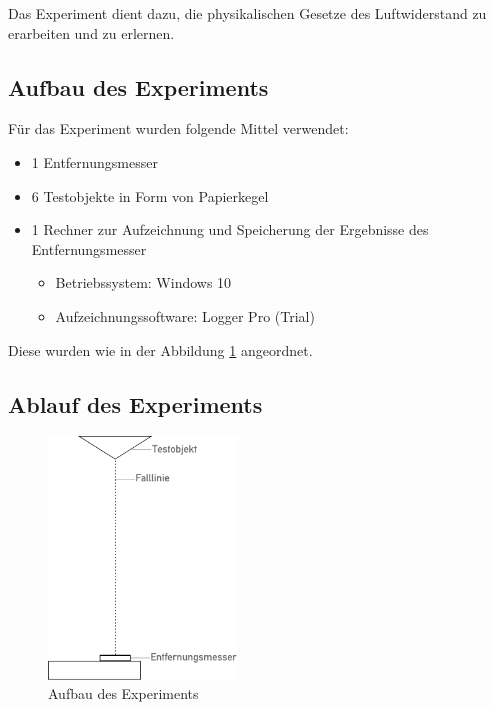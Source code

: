 Das Experiment dient dazu, die physikalischen Gesetze des Luftwiderstand zu erarbeiten und zu erlernen. 

\subsection{Aufbau des Experiments}

Für das Experiment wurden folgende Mittel verwendet:

\begin{itemize}
	\item 1 Entfernungsmesser
	\item 6 Testobjekte in Form von Papierkegel
	\item 1 Rechner zur Aufzeichnung und Speicherung der Ergebnisse des Entfernungsmesser
	\begin{itemize}
		\item Betriebssystem: Windows 10 
		\item Aufzeichnungssoftware: Logger Pro (Trial)
	\end{itemize}
\end{itemize}

Diese wurden wie in der Abbildung \ref{fig:expsetup} angeordnet.

\subsection{Ablauf des Experiments}



\begin{figure}
	\center
	\includegraphics[width=5cm]{diagrams/experiment_aufbau}\caption{\label{fig:expsetup} Aufbau des Experiments}	
\end{figure}
